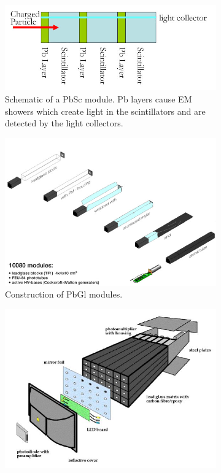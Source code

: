 \begin{figure}
\centering
\begin{subfigure}[p]{0.5\textwidth}
    \centering
    \includegraphics[width=\textwidth]{Figures/PbScschematic.jpg}\ssp
    \caption{Schematic of a PbSc module. Pb layers cause EM showers which create light in the scintillators and are detected by the light collectors.}
\label{fig:pbsc}
\end{subfigure}
\begin{subfigure}[b]{0.6\textwidth}
    \centering
    \includegraphics[width=\textwidth]{Figures/PbGlmodules.jpg}
    \caption{Construction of PbGl modules.}
\label{fig:pbglmodule}
\end{subfigure}
\begin{subfigure}[b]{0.6\textwidth}
    \centering
    \includegraphics[width=\textwidth]{Figures/pbglsupermodule.JPG}

\end{subfigure}
\end{figure}
